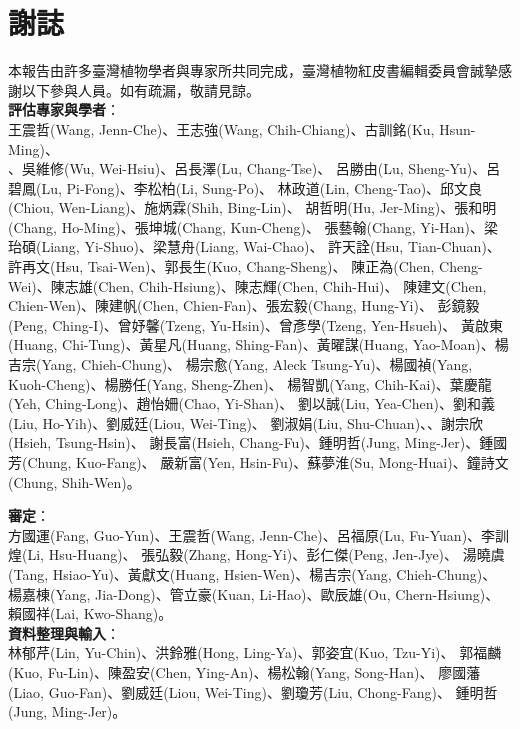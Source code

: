 \chapter{謝誌}

\linespread{1.1}\selectfont
本報告由許多臺灣植物學者與專家所共同完成，臺灣植物紅皮書編輯委員會誠摯感謝以下參與人員。如有疏漏，敬請見諒。 \\
\noindent \textbf{評估專家與學者}：\\
\noindent 王震哲(Wang, Jenn-Che)、王志強(Wang, Chih-Chiang)、古訓銘(Ku, Hsun-Ming)、\\
、吳維修(Wu, Wei-Hsiu)、呂長澤(Lu, Chang-Tse)、
呂勝由(Lu, Sheng-Yu)、呂碧鳳(Lu, Pi-Fong)、李松柏(Li, Sung-Po)、
林政道(Lin, Cheng-Tao)、邱文良(Chiou, Wen-Liang)、施炳霖(Shih, Bing-Lin)、
胡哲明(Hu, Jer-Ming)、張和明(Chang, Ho-Ming)、張坤城(Chang, Kun-Cheng)、
張藝翰(Chang, Yi-Han)、梁珆碩(Liang, Yi-Shuo)、梁慧舟(Liang, Wai-Chao)、
許天詮(Hsu, Tian-Chuan)、許再文(Hsu, Tsai-Wen)、郭長生(Kuo, Chang-Sheng)、
陳正為(Chen, Cheng-Wei)、陳志雄(Chen, Chih-Hsiung)、陳志輝(Chen, Chih-Hui)、
陳建文(Chen, Chien-Wen)、陳建帆(Chen, Chien-Fan)、張宏毅(Chang, Hung-Yi)、
彭鏡毅(Peng, Ching-I)、曾妤馨(Tzeng, Yu-Hsin)、曾彥學(Tzeng, Yen-Hsueh)、
黃啟東(Huang, Chi-Tung)、黃星凡(Huang, Shing-Fan)、黃曜謀(Huang, Yao-Moan)、楊吉宗(Yang, Chieh-Chung)、
楊宗愈(Yang, Aleck Tsung-Yu)、楊國禎(Yang, Kuoh-Cheng)、楊勝任(Yang, Sheng-Zhen)、
楊智凱(Yang, Chih-Kai)、葉慶龍(Yeh, Ching-Long)、趙怡姍(Chao, Yi-Shan)、
劉以誠(Liu, Yea-Chen)、劉和義(Liu, Ho-Yih)、劉威廷(Liou, Wei-Ting)、
劉淑娟(Liu, Shu-Chuan)、、謝宗欣(Hsieh, Tsung-Hsin)、
謝長富(Hsieh, Chang-Fu)、鍾明哲(Jung, Ming-Jer)、鍾國芳(Chung, Kuo-Fang)、
嚴新富(Yen, Hsin-Fu)、蘇夢淮(Su, Mong-Huai)、鐘詩文(Chung, Shih-Wen)。

\noindent \textbf{審定}：\\
方國運(Fang, Guo-Yun)、王震哲(Wang, Jenn-Che)、呂福原(Lu, Fu-Yuan)、李訓煌(Li, Hsu-Huang)、
張弘毅(Zhang, Hong-Yi)、彭仁傑(Peng, Jen-Jye)、
湯曉虞(Tang, Hsiao-Yu)、黃獻文(Huang, Hsien-Wen)、楊吉宗(Yang, Chieh-Chung)、
楊嘉棟(Yang, Jia-Dong)、管立豪(Kuan, Li-Hao)、歐辰雄(Ou, Chern-Hsiung)、
賴國祥(Lai, Kwo-Shang)。 \\

\noindent \textbf{資料整理與輸入}：\\
林郁芹(Lin, Yu-Chin)、洪鈴雅(Hong, Ling-Ya)、郭姿宜(Kuo, Tzu-Yi)、
郭福麟(Kuo, Fu-Lin)、陳盈安(Chen, Ying-An)、楊松翰(Yang, Song-Han)、
廖國藩(Liao, Guo-Fan)、劉威廷(Liou, Wei-Ting)、劉瓊芳(Liu, Chong-Fang)、
鍾明哲(Jung, Ming-Jer)。

\linespread{1}\selectfont

